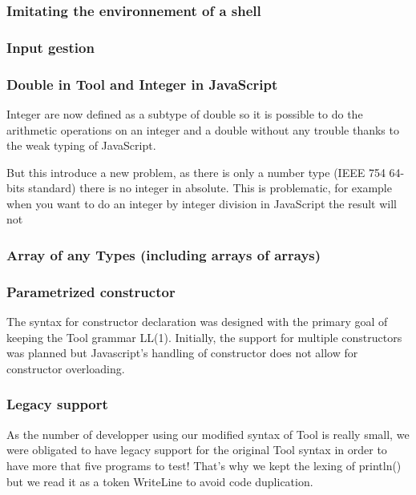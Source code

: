 \subsubsection{Imitating the environnement of a shell}
\subsubsection{Input gestion}


\subsubsection{Double in Tool and Integer in JavaScript}
Integer are now defined as a subtype of double so it is possible to do the arithmetic operations on an integer and a double without any trouble thanks to the weak typing of JavaScript.

But this introduce a new problem, as there is only a number type (IEEE 754 64-bits standard) there is no integer in absolute. This is problematic, for example when you want to do an integer by integer division
in JavaScript the result will not

\subsubsection{Array of any Types (including arrays of arrays)}

\subsubsection{Parametrized constructor}
The syntax for constructor declaration was designed with the primary
goal of keeping the Tool grammar LL(1). Initially, the support for
multiple constructors was planned but Javascript's handling of
constructor does not allow for constructor overloading.

\subsubsection{Legacy support}
As the number of developper using our modified syntax of Tool is really small, we were obligated to have legacy support for the original Tool syntax in order to have more that five programs to test!
That's why we kept the lexing of println() but we read it as a token WriteLine to avoid code duplication.
